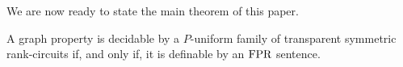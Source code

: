 \documentclass[../paper.tex]{subfiles}
\begin{document}



We are now ready to state the main theorem of this paper.

\begin{thm}
  A graph property is decidable by a $P$-uniform family of transparent symmetric
  rank-circuits if, and only if, it is definable by an $\text{\upshape FPR}$ sentence.
\end{thm}






\end{document}
